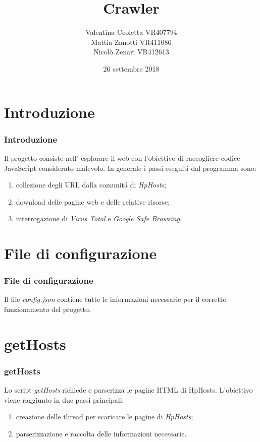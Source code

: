 \documentclass[aspectratio=169]{beamer}
\begin{document}
\title{Crawler}
\date{26 settembre 2018}
\author[]{Valentina Ceoletta VR407794\\Mattia Zanotti VR411086\\Nicol\`o Zenari VR412613}

\begin{frame}
	\maketitle
\end{frame}

\begin{frame}
	\tableofcontents
\end{frame}

\section{Introduzione}
\begin{frame}
	\frametitle{Introduzione}
Il progetto consiste nell' esplorare il web con l'obiettivo di raccogliere codice JavaScript considerato malevolo. In generale i passi eseguiti dal programma sono:
\begin{enumerate}
	\item collezione degli URL dalla comunit\'a di \textit{HpHosts};
	\item download delle pagine web e delle relative risorse;
	\item interrogazione di \textit{Virus Total} e \textit{Google Safe Browsing}.
\end{enumerate}
\end{frame}

\section{File di configurazione}
\begin{frame}
	\frametitle{File di configurazione}
Il file \textit{config.json} contiene tutte le informazioni necessarie per il corretto funzionamento del progetto.
\end{frame}

\section{getHosts}
\begin{frame}
	\frametitle{getHosts}
Lo script \textit{getHosts} richiede e parserizza le pagine HTML di HpHosts. L'obiettivo viene raggiunto in due passi principali:
\begin{enumerate}
	\item creazione delle thread per scaricare le pagine di \textit{HpHosts};
	\item parserizzazione e raccolta delle informazioni necessarie.
\end{enumerate}
\end{frame}
\end{document}
